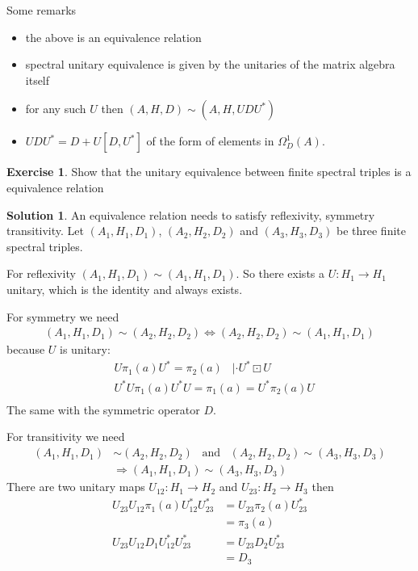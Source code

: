 \documentclass[a4paper]{article}
\theoremstyle{definition}
\theoremstyle{definition}
\theoremstyle{definition}
\theoremstyle{theorem}
\theoremstyle{theorem}
\theoremstyle{theorem}
\newtheorem{exercise}{Exercise}
\theoremstyle{definition}
\newtheorem{solution}{Solution}
\begin{document}
Some remarks
\begin{itemize}
    \item the above is an equivalence relation
    \item spectral unitary equivalence is given by the unitaries of the
        matrix algebra itself
    \item for any such $U$ then $(A, H, D) \sim (A, H, UDU^*)$
    \item $UDU^* = D + U[D, U^*]$ of the form of elements in
        $\Omega _D^1 (A)$.
\end{itemize}

\begin{exercise}
    Show that the unitary equivalence between finite spectral
    triples is a equivalence relation
\end{exercise}

\begin{solution}
    An equivalence relation needs to satisfy reflexivity, symmetry
    transitivity.
    Let $(A_1, H_1, D_1)$, $(A_2, H_2, D_2)$ and $(A_3, H_3, D_3)$
    be three finite spectral triples.
    \newline

    For reflexivity $(A_1, H_1, D_1) \sim (A_1, H_1, D_1)$. So there
    exists a $U: H_1 \rightarrow H_1$ unitary, which is the identity
    and always exists.
    \newline

    For symmetry we need
    \begin{align*}
        (A_1, H_1, D_1) \sim (A_2, H_2, D_2) \Leftrightarrow
        (A_2, H_2, D_2) \sim (A_1, H_1, D_1)
    \end{align*}
    because $U$ is unitary:
    \begin{align*}
        &U\pi_1(a)U^* = \pi_2(a) \;\;\; | \cdot U^*\boxdot U \\
        &U^*U\pi_1(a)U^*U = \pi_1(a) = U^*\pi_2(a)U \\
    \end{align*}
    The same with the symmetric operator $D$.
    \newline

    For transitivity we need
    \begin{align*}
        (A_1, H_1, D_1) &\sim (A_2, H_2, D_2) \;\;\; \text{and} \;\;\;
        (A_2, H_2, D_2) \sim (A_3, H_3, D_3) \\
        &\Rightarrow (A_1, H_1, D_1) \sim (A_3, H_3, D_3)
    \end{align*}
    There are two unitary maps $U_{12}:H_1 \rightarrow H_2$ and
    $U_{23}: H_2 \rightarrow H_3$ then
    \begin{align*}
        U_{23}U_{12} \pi_1(a) U^*_{12}U^*_{23} &= U_{23}
        \pi_2(a) U_23^* \\
        &= \pi_3(a) \\
        U_{23}U_{12} D_1U^*_{12}U^*_{23} &= U_{23}
        D_2 U_23^* \\
        &= D_3
    \end{align*}
\end{solution}
\end{document}
